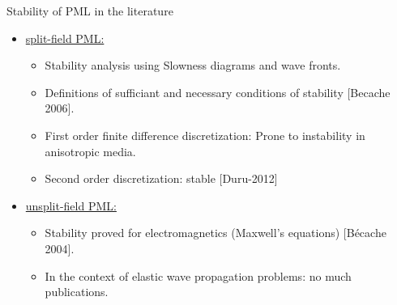 \begin{frame}{Stability of PML in the literature}
\pause
    \begin{itemize}
        \item \underline{split-field PML:} 
        \begin{itemize}
        \pause
        	\item Stability analysis using Slowness diagrams and wave fronts.
        	\item Definitions of sufficiant and necessary conditions of stability [Becache 2006]. 
            \item First order finite difference discretization: Prone to instability in anisotropic media.
            \item Second order discretization: stable [Duru-2012]

        \end{itemize}
    \item \underline{unsplit-field PML:} 
        \begin{itemize}
        \pause
            \item Stability proved for electromagnetics (Maxwell's equations) [Bécache 2004].
            \pause
            \item In the context of elastic wave propagation problems: no much publications.
        \end{itemize}
    \end{itemize}
\end{frame}

